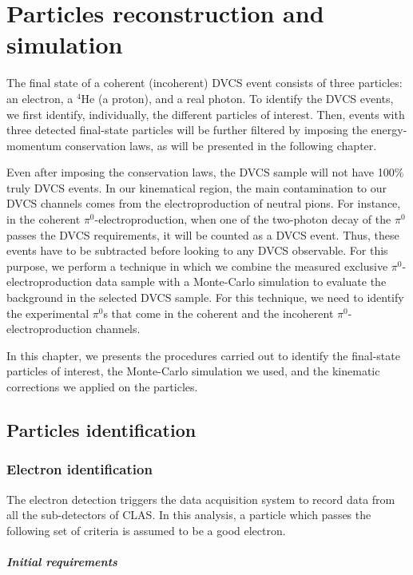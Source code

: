 \chapter{Particles reconstruction and simulation}
The final state of a coherent (incoherent) DVCS event consists of three 
particles: an electron, a $^4$He (a proton), and a real photon. To identify the 
DVCS events, we first identify, individually, the different particles of 
interest. Then, events with three detected final-state particles will be 
further filtered by imposing the energy-momentum conservation laws, as will be 
presented in the following chapter. 


Even after imposing the conservation laws, the DVCS sample will not have 
100$\%$ truly DVCS events. In our kinematical region, the main contamination to 
our DVCS channels comes from the electroproduction of neutral pions. For 
instance, in the coherent $\pi^0$-electroproduction, when one of the two-photon 
decay of the $\pi^{0}$ passes the DVCS requirements, it will be counted as a 
DVCS event. Thus, these events have to be subtracted before looking to any DVCS 
observable. For this purpose, we perform a technique in which we combine the 
measured exclusive $\pi^0$-electroproduction data sample with a Monte-Carlo 
simulation to evaluate the background in the selected DVCS sample. For this 
technique, we need to identify the experimental $\pi^0$s that come in the 
coherent and the incoherent $\pi^0$-electroproduction channels.
 
 
In this chapter, we presents the procedures carried out to identify the 
final-state particles of interest, the Monte-Carlo simulation we used, and the 
kinematic corrections we applied on the particles.

\section{Particles identification}
     
\subsection{Electron identification} \label{Electron_identification}
The electron detection triggers the data acquisition system to record data 
from all the sub-detectors of CLAS. In this analysis, a particle which passes 
the following set of criteria is assumed to be a good electron.
  
\paragraph{Initial requirements}

